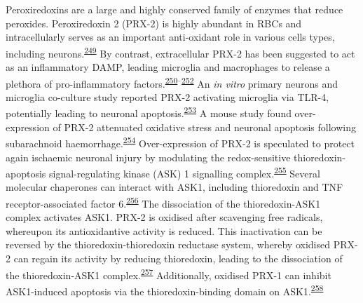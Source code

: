 \documentclass[
]{article}
\begin{document}
Peroxiredoxins are a large and highly conserved family of enzymes that reduce peroxides.
Peroxiredoxin 2 (PRX-2) is highly abundant in RBCs and intracellularly serves as an important anti-oxidant role in various cells types, including neurons.\textsuperscript{\protect\hyperlink{ref-low_peroxiredoxin_2008}{249}}
By contrast, extracellular PRX-2 has been suggested to act as an inflammatory DAMP, leading microglia and macrophages to release a plethora of pro-inflammatory factors.\textsuperscript{\protect\hyperlink{ref-salzano_linkage_2014}{250}--\protect\hyperlink{ref-shichita_peroxiredoxin_2012}{252}}
An \emph{in vitro} primary neurons and microglia co-culture study reported PRX-2 activating microglia via TLR-4, potentially leading to neuronal apoptosis.\textsuperscript{\protect\hyperlink{ref-lu_peroxiredoxin_2018}{253}}
A mouse study found over-expression of PRX-2 attenuated oxidative stress and neuronal apoptosis following subarachnoid haemorrhage.\textsuperscript{\protect\hyperlink{ref-lu_peroxiredoxin_2019}{254}}
Over-expression of PRX-2 is speculated to protect again ischaemic neuronal injury by modulating the redox-sensitive thioredoxin-apoptosis signal-regulating kinase (ASK) 1 signalling complex.\textsuperscript{\protect\hyperlink{ref-gan_transgenic_2012}{255}}
Several molecular chaperones can interact with ASK1, including thioredoxin and TNF receptor-associated factor 6.\textsuperscript{\protect\hyperlink{ref-matsuzawa_ros-dependent_2005}{256}}
The dissociation of the thioredoxin-ASK1 complex activates ASK1.
PRX-2 is oxidised after scavenging free radicals, whereupon its antioxidantive activity is reduced.
This inactivation can be reversed by the thioredoxin-thioredoxin reductase system, whereby oxidised PRX-2 can regain its activity by reducing thioredoxin, leading to the dissociation of the thioredoxin-ASK1 complex.\textsuperscript{\protect\hyperlink{ref-rhee_multiple_2011}{257}}
Additionally, oxidised PRX-1 can inhibit ASK1-induced apoptosis via the thioredoxin-binding domain on ASK1.\textsuperscript{\protect\hyperlink{ref-kim_novel_2008}{258}}
\end{document}
